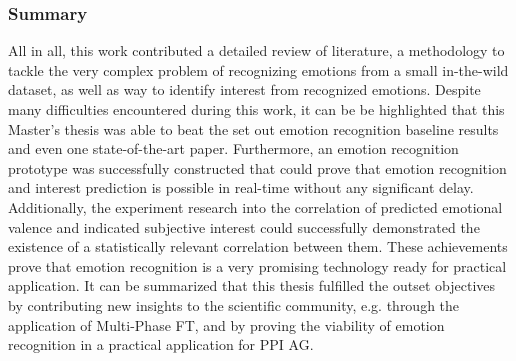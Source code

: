 \subsubsection{Summary}
All in all, this work contributed a detailed review of literature, a methodology to tackle the very complex problem of recognizing emotions from a small in-the-wild dataset, as well as way to identify interest from recognized emotions. Despite many difficulties encountered during this work, it can be be highlighted that this Master's thesis was able to beat the set out emotion recognition baseline results and even one state-of-the-art paper. 
\newline\newline
Furthermore, an emotion recognition prototype was successfully constructed that could prove that emotion recognition and interest prediction is possible in real-time without any significant delay. Additionally, the experiment research into the correlation of predicted emotional valence and indicated subjective interest could successfully demonstrated the existence of a statistically relevant correlation between them. These achievements prove that emotion recognition is a very promising technology ready for practical application.
\newline\newline
It can be summarized that this thesis fulfilled the outset objectives by contributing new insights to the scientific community, e.g. through the application of Multi-Phase FT, and by proving the viability of emotion recognition in a practical application for PPI AG.

